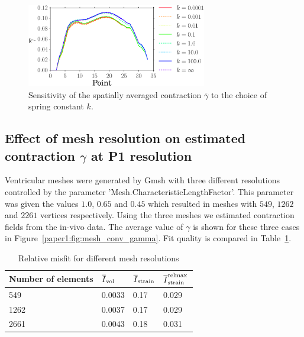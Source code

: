 \begin{table}
\caption{Sensitivity of optimal $a$ value to choice of spring constant
  $k$.}
\label{paper1:tab:elast_sense}
\end{table}

\begin{figure}[t]
\includegraphics[width=0.7\textwidth]{gamma_mean}
\caption{Sensitivity of the spatially averaged 
contraction $\overline{\gamma}$ to the choice of spring constant $k$.}
\label{paper1:fig:gamma_sense}
\end{figure}


\subsection{Effect of mesh resolution on estimated contraction
  $\gamma$ at P1 resolution} 
\label{paper1:sec:mesh_res}
Ventricular meshes were generated by Gmsh
\cite{geuzaine2009gmsh} with three different resolutions controlled by the parameter
'Mesh.CharacteristicLengthFactor'.  This parameter
was given the values $1.0$, $0.65$ and $0.45$ which resulted in meshes with
$549$, $1262$ and $2261$ vertices respectively. Using the three meshes
we estimated contraction fields from the in-vivo data. The average value of
$\gamma$ is shown for these three cases in Figure~\ref{paper1:fig:mesh_conv_gamma}. 
Fit quality is compared in Table~\ref{paper1:tab:mesh_conv_opt_misfit}.

\begin{table}
\caption{Relative misfit for different mesh resolutions}
\begin{tabular}{llll}
\toprule
Number of elements & $\overline{I}_{\text{vol}}$ & $\overline{I}_{\text{strain}}$ & $\overline{I}^{\text{relmax}}_{\text{strain}}$ \\ 
\midrule
549  & 0.0033 & 0.17 & 0.029 \\
1262 & 0.0037 & 0.17 & 0.029 \\
2661 & 0.0043 & 0.18 & 0.031 \\
\bottomrule	
\end{tabular}
\label{paper1:tab:mesh_conv_opt_misfit}
\end{table}

